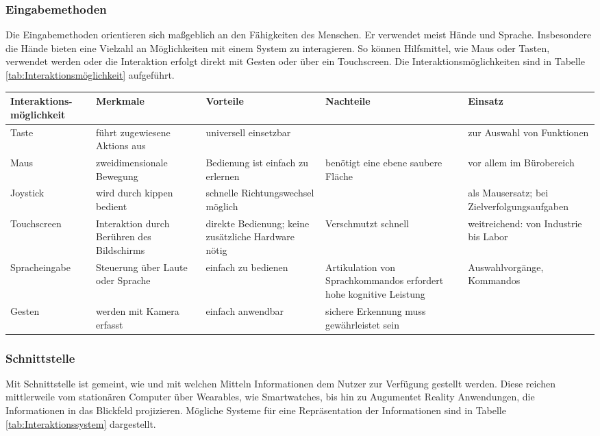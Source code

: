 \subsubsection*{Eingabemethoden}
\label{2:Eingabemethoden}
Die Eingabemethoden orientieren sich maßgeblich an den Fähigkeiten des Menschen. Er verwendet meist Hände und Sprache. Insbesondere die Hände bieten eine Vielzahl an Möglichkeiten mit einem System zu interagieren. So können Hilfsmittel, wie Maus oder Tasten, verwendet werden oder die Interaktion erfolgt direkt mit Gesten oder über ein Touchscreen. Die Interaktionsmöglichkeiten sind in Tabelle \ref{tab:Interaktionsmöglichkeit} aufgeführt. \cite{Zuhlke2012, Heinecke2012}

\begin{sidewaystable}[ph!]
\caption{Interaktionsmöglichkeiten mit einem Assistenzsystem}
\begin{tabular}{p{3cm}|p{3cm}|p{}|p{4cm}|p{}}
	\textbf{Interaktions-möglichkeit} & \textbf{Merkmale} & \textbf{Vorteile} & \textbf{Nachteile} & \textbf{Einsatz} \\
	\hline
	Taste & führt zugewiesene Aktions aus & universell einsetzbar & & zur Auswahl von Funktionen \\
	\hline
	Maus & zweidimensionale Bewegung & Bedienung ist einfach zu erlernen & benötigt eine ebene saubere Fläche & vor allem im Bürobereich\\
	\hline
	Joystick & wird durch kippen bedient & schnelle Richtungswechsel möglich & & als Mausersatz; bei Zielverfolgungsaufgaben \\
	\hline
	Touchscreen & Interaktion durch Berühren des Bildschirms & direkte Bedienung; keine zusätzliche Hardware nötig & Verschmutzt schnell & weitreichend: von Industrie bis Labor \\
	\hline
	Spracheingabe & Steuerung über Laute oder Sprache & einfach zu bedienen & Artikulation von Sprachkommandos erfordert hohe kognitive Leistung & Auswahlvorgänge, Kommandos \\
	\hline
	Gesten & werden mit Kamera erfasst & einfach anwendbar & sichere Erkennung muss gewährleistet sein & \\
\end{tabular}
\label{tab:Interaktionsmöglichkeit}
\end{sidewaystable}

\subsubsection*{Schnittstelle}
\label{2:Schnittstelle}
Mit Schnittstelle ist gemeint, wie und mit welchen Mitteln Informationen dem Nutzer zur Verfügung gestellt werden. Diese reichen mittlerweile vom stationären Computer über Wearables, wie Smartwatches, bis hin zu Augumentet Reality Anwendungen, die Informationen in das Blickfeld projizieren. Mögliche Systeme für eine Repräsentation der Informationen sind in Tabelle \ref{tab:Interaktionssystem} dargestellt. \cite{Zuhlke2012, Kasselmann2016, Weidner2016, Ludwig}


